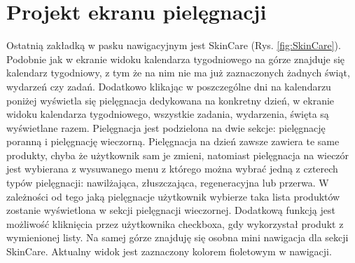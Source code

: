\section{Projekt ekranu pielęgnacji}
Ostatnią zakładką w pasku nawigacyjnym jest SkinCare (Rys. \ref{fig:SkinCare}). Podobnie jak w ekranie widoku kalendarza tygodniowego na górze znajduje się kalendarz tygodniowy, z tym że na nim nie ma już zaznaczonych żadnych świąt, wydarzeń czy zadań. Dodatkowo klikając w poszczególne dni na kalendarzu poniżej wyświetla się pielęgnacja dedykowana na konkretny dzień, w ekranie widoku kalendarza tygodniowego, wszystkie zadania, wydarzenia, święta są wyświetlane razem. Pielęgnacja jest podzielona na dwie sekcje: pielęgnację poranną i pielęgnację wieczorną. Pielęgnacja na dzień zawsze zawiera te same produkty, chyba że użytkownik sam je zmieni, natomiast pielęgnacja na wieczór jest wybierana z wysuwanego menu z którego można wybrać jedną z czterech typów pielęgnacji: nawilżająca, złuszczająca, regeneracyjna lub przerwa. W zależności od tego jaką pielęgnacje użytkownik wybierze taka lista produktów zostanie wyświetlona w sekcji pielęgnacji wieczornej. Dodatkową funkcją jest możliwość kliknięcia przez użytkownika checkboxa, gdy wykorzystał produkt z wymienionej listy. Na samej górze znajduję się osobna mini nawigacja dla sekcji SkinCare. Aktualny widok jest zaznaczony kolorem fioletowym w nawigacji.

